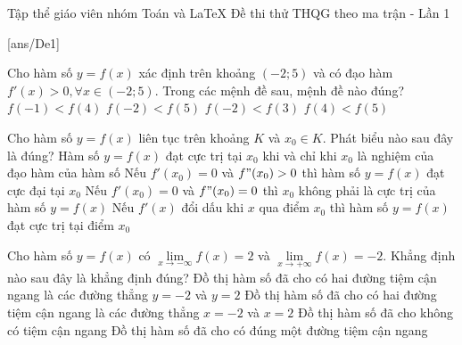 
\begin{name}
	{Tập thể giáo viên nhóm Toán và \LaTeX}
	{Đề thi thử THQG theo ma trận - Lần 1}
\end{name}
\setcounter{ex}{0}

[ans/De1]
\begin{ex}%
	Cho hàm số $y=f(x)$ xác định trên khoảng $(-2;5)$ và có đạo hàm $f'(x)>0, \forall x\in (-2;5)$. Trong các mệnh đề sau, mệnh đề nào đúng?
	\choice
	{\True $f(-1)<f(4)$}
	{$f(-2)<f(5)$}
	{$f(-2)<f(3)$}
	{$f(4)<f(5)$}
\end{ex}

\begin{ex}%
	Cho hàm số $y=f(x)$ liên tục trên khoảng $K$ và $x_0 \in K$. Phát biểu nào sau đây là đúng?
	\choice
	{Hàm số $y=f(x)$ đạt cực trị tại $x_0$ khi và chỉ khi $x_0$ là nghiệm của đạo hàm của hàm số}
	{Nếu $f'(x_0)=0$ và $f"(x_0)>0$ thì hàm số $y=f(x)$ đạt cực đại tại $x_0$}
	{Nếu $f'(x_0)=0$ và $f"(x_0)=0$ thì $x_0$ không phải là cực trị của hàm số $y=f(x)$}
	{\True Nếu $f'(x)$ đổi dấu khi $x$ qua điểm $x_0$ thì hàm số $y=f(x)$ đạt cực trị tại điểm $x_0$}
\end{ex}

\begin{ex}%
	Cho hàm số $y=f(x)$ có $\lim\limits_{x\rightarrow -\infty}f(x)= 2$ và $\lim\limits_{x\rightarrow +\infty}f(x)= -2$.
	Khẳng định nào sau đây là khẳng định đúng?
	\choice
	{\True Đồ thị hàm số đã cho có hai đường tiệm cận ngang là các đường thẳng $y=-2$ và $y=2$}
	{Đồ thị hàm số đã cho có hai đường tiệm cận ngang là các đường thẳng $x=-2$ và $x=2$}
	{Đồ thị hàm số đã cho không có tiệm cận ngang}
	{Đồ thị hàm số đã cho có đúng một đường tiệm cận ngang}
\end{ex}

